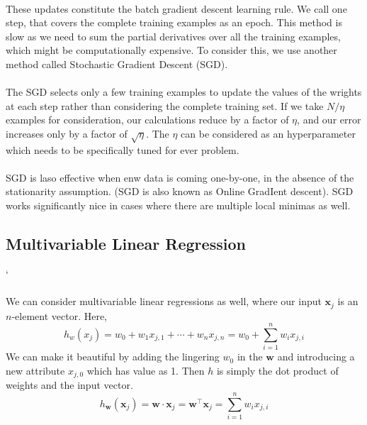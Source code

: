 \documentclass{article}
\begin{document}
        \paragraph{}
            These updates constitute the batch gradient descent learning rule. We call one step, that covers the complete training examples as an epoch. This method is slow as we need to sum the partial derivatives over all the training examples, which might be computationally expensive. To consider this, we use another method called Stochastic Gradient Descent (SGD).
        \paragraph{}
            The SGD selects only a few training examples to update the values of the wrights at each step rather than considering the complete training set. If we take $N/\eta$ examples for consideration, our calculations reduce by a factor of $\eta$, and our error increases only by a factor of $\sqrt{\eta}$. The $\eta$ can be considered as an hyperparameter which needs to be specifically tuned for ever problem.
        \paragraph{}
            SGD is laso effective when enw data is coming one-by-one, in the absence of the stationarity assumption. (SGD is also known as Online GradIent descent). SGD works significantly nice in cases where there are multiple local minimas as well.
            \newpage
    \subsection{Multivariable Linear Regression}
        `\paragraph{}
            We can consider multivariable linear regressions as well, where our input $\mathbf{x}_j$ is an $n$-element vector. Here,
            \begin{equation*}
                h_w(x_j) = w_0 + w_1 x_{j,1} + \cdots + w_n x_{j,n} = w_0 + \sum_{i=1}^{n} w_i x_{j,i}
            \end{equation*}
            We can make it beautiful by adding the lingering $w_0$ in the $\mathbf{w}$ and introducing a new attribute $x_{j,0}$ which has value as 1. Then $h$ is simply the dot product of weights and the input vector.
            \begin{equation*}
                h_{\mathbf{w}}(\mathbf{x}_j) = \mathbf{w} \cdot \mathbf{x}_j = \mathbf{w}^{\top} \mathbf{x}_j = \sum_{i=1}^{n} w_i x_{j,i}
            \end{equation*}
\end{document}
